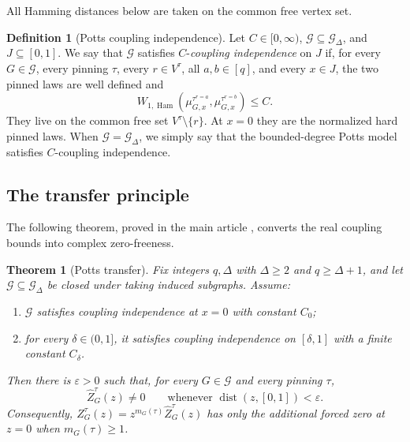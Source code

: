 \documentclass[11pt,reqno]{article}
\theoremstyle{plain}
\newtheorem{theorem}{Theorem}[section]
\theoremstyle{definition}
\newtheorem{definition}[definition]{Definition}
\theoremstyle{remark}
\newcommand{\eps}{\varepsilon}
\newcommand{\dist}{\operatorname{dist}}
\DeclareMathOperator{\Ham}{Ham}
\newcommand{\Deg}{\Delta}                        %
\newcommand{\WHam}{W_{1,\Ham}}                   %
\newcommand{\colours}{[q]}                        %
\newcommand{\Gdeg}{\mathcal{G}_{\Deg}}
\newcommand{\Zpin}[2]{Z_{#1}^{#2}}
\newcommand{\nZpin}[2]{\widehat Z_{#1}^{#2}}
\newcommand{\mupin}[3]{\mu_{#1,#3}^{#2}}
\begin{document}
All Hamming distances below are taken on the common free vertex set.

\begin{definition}[Potts coupling independence]\label{def:potts-ci}
Let \(C\in[0,\infty)\), \(\mathcal G\subseteq\Gdeg\), and
\(J\subseteq[0,1]\).  We say that
\(\mathcal G\) satisfies \(C\)-\emph{coupling independence} on \(J\) if,
for every \(G\in\mathcal G\), every pinning \(\tau\), every
\(r\in V^\tau\), all \(a,b\in\colours\), and every \(x\in J\), the two
pinned laws are well defined and
\begin{equation}\label{eq:potts-ci}
  \WHam\!\left(
    \mupin{G}{\tau^{r=a}}{x},
    \mupin{G}{\tau^{r=b}}{x}
  \right)\le C.
\end{equation}
They live on the common free set \(V^\tau\setminus\{r\}\).  At \(x=0\)
they are the normalized hard pinned laws.  When
\(\mathcal G=\Gdeg\), we simply say that the bounded-degree Potts model
satisfies \(C\)-coupling independence.
\end{definition}

\subsection{The transfer principle}

The following theorem, proved in the main article
\cite{ShaoShi2026ZeroFreeness}, converts the real coupling bounds into complex
zero-freeness.

\begin{theorem}[Potts transfer]
\label{thm:potts-transfer}
Fix integers \(q,\Deg\) with \(\Deg\ge2\) and \(q\ge\Deg+1\), and let
\(\mathcal G\subseteq\Gdeg\) be closed under taking induced subgraphs.  Assume:
\begin{enumerate}[label=\textup{(\roman*)}]
  \item \(\mathcal G\) satisfies coupling independence at \(x=0\) with
        constant \(C_0\);
  \item for every \(\delta\in(0,1]\), it satisfies coupling independence
        on \([\delta,1]\) with a finite constant \(C_\delta\).
\end{enumerate}
Then there is \(\eps>0\) such that, for every \(G\in\mathcal G\) and every
pinning \(\tau\),
\[
  \nZpin{G}{\tau}(z)\ne0
  \qquad\text{whenever }\dist(z,[0,1])<\eps.
\]
Consequently,
\(\Zpin{G}{\tau}(z)=z^{m_G(\tau)}\nZpin{G}{\tau}(z)\) has only the
additional forced zero at \(z=0\) when \(m_G(\tau)\ge1\).
\end{theorem}
\end{document}
